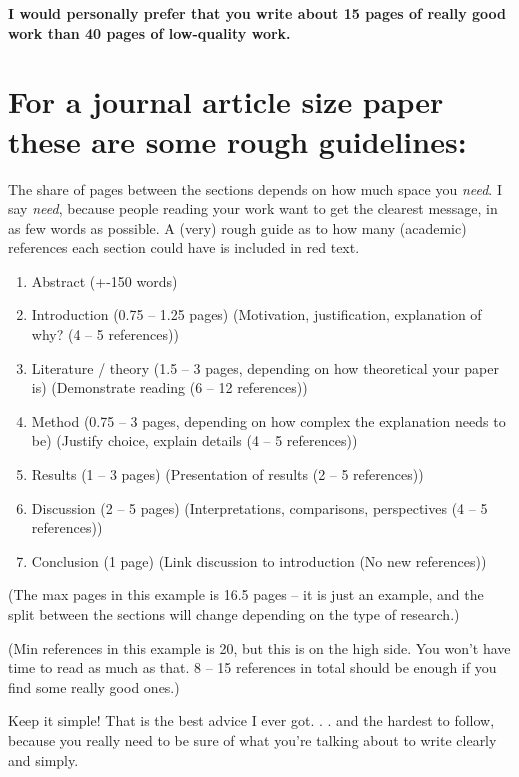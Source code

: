 \documentclass[
]{book}
\begin{document}
\textbf{I would personally prefer that you write about 15 pages of really good
work than 40 pages of low-quality work.}

\hypertarget{for-a-journal-article-size-paper-these-are-some-rough-guidelines}{%
\section{For a journal article size paper these are some rough guidelines:}\label{for-a-journal-article-size-paper-these-are-some-rough-guidelines}}

The share of pages between the sections depends on how much space you
\emph{need}. I say \emph{need}, because people reading your work want to get the
clearest message, in as few words as possible. A (very) rough guide as
to how many (academic) references each section could have is included in
red text.

\begin{enumerate}
\def\labelenumi{\arabic{enumi}.}
\item
  Abstract (+-150 words)
\item
  Introduction (0.75 -- 1.25 pages) (Motivation, justification,
  explanation of why? (4 -- 5 references))
\item
  Literature / theory (1.5 -- 3 pages, depending on how theoretical
  your paper is) (Demonstrate reading (6 -- 12 references))
\item
  Method (0.75 -- 3 pages, depending on how complex the explanation
  needs to be) (Justify choice, explain details (4 -- 5 references))
\item
  Results (1 -- 3 pages) (Presentation of results (2 -- 5 references))
\item
  Discussion (2 -- 5 pages) (Interpretations, comparisons,
  perspectives (4 -- 5 references))
\item
  Conclusion (1 page) (Link discussion to introduction (No new
  references))
\end{enumerate}

(The max pages in this example is 16.5 pages -- it is just an example,
and the split between the sections will change depending on the type of
research.)

(Min references in this example is 20, but this is on the high side. You
won't have time to read as much as that. 8 -- 15 references in total
should be enough if you find some really good ones.)

Keep it simple! That is the best advice I ever got. . . and the hardest
to follow, because you really need to be sure of what you're talking
about to write clearly and simply.
\end{document}
